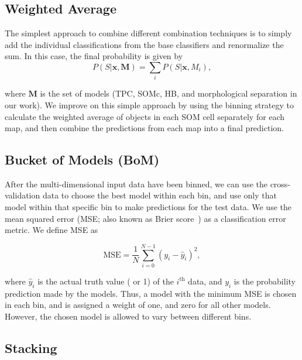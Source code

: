 \subsection{Weighted Average}

The simplest approach to combine different combination techniques is
to simply add the individual classifications from the base classifiers
and renormalize the sum.
In this case, the final probability is given by
\begin{equation}
P\left(S | \mathbf{x}, \mathbf{M} \right)
= \sum_{i} P \left( S | \mathbf{x}, M_{i} \right),
\end{equation}

\noindent
where $\mathbf{M}$ is the set of models
(TPC, SOMc, HB, and morphological separation
in our work).
We improve on this simple approach
by using the binning strategy to
calculate the weighted average of objects in each SOM cell
separately for each map,
and then combine the predictions from each map into a final prediction.


\subsection{Bucket of Models (BoM)}

After the multi-dimensional input data have been binned,
we can use the cross-validation data
to choose the best model within each bin,
and use only that model within that specific bin
to make predictions for the test data.
We use the mean squared error
(MSE; also known as Brier score~\citep{brier1950verification})
as a classification error metric. We define MSE as

\begin{equation} \label{eq:mse}
  \mathrm{MSE} = \frac{1}{N} \sum^{N - 1}_{i = 0}
  \left( y_i - \hat{y}_i \right)^2,
\end{equation}

\noindent
where $\hat{y}_i$ is the actual truth value
( or 1) of the $i^{\text{th}}$ data, 
and $y_{i}$ is the probability prediction made by the models.
Thus, a model with the minimum MSE is chosen in each bin,
and is assigned a weight of one,
and zero for all other models.
However, the chosen model is allowed to vary between different bins.

\subsection{Stacking}


